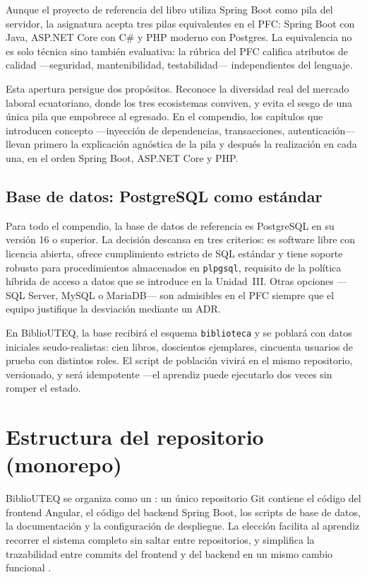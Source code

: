 Aunque el proyecto de referencia del libro utiliza Spring Boot como pila del servidor, la asignatura acepta tres pilas equivalentes en el PFC: Spring Boot con Java, ASP.NET Core con C\# y PHP moderno con Postgres. La equivalencia no es solo t\'ecnica sino tambi\'en evaluativa: la r\'ubrica del PFC califica atributos de calidad ---seguridad, mantenibilidad, testabilidad--- independientes del lenguaje.

Esta apertura persigue dos prop\'ositos. Reconoce la diversidad real del mercado laboral ecuatoriano, donde los tres ecosistemas conviven, y evita el sesgo de una \'unica pila que empobrece al egresado. En el compendio, los cap\'itulos que introducen concepto ---inyecci\'on de dependencias, transacciones, autenticaci\'on--- llevan primero la explicaci\'on agn\'ostica de la pila y despu\'es la realizaci\'on en cada una, en el orden Spring Boot, ASP.NET Core y PHP.

\subsection{Base de datos: PostgreSQL como est\'andar}
\label{sec:u0:arq:bd}

Para todo el compendio, la base de datos de referencia es PostgreSQL en su versi\'on 16 o superior. La decisi\'on descansa en tres criterios: es software libre con licencia abierta, ofrece cumplimiento estricto de SQL est\'andar y tiene soporte robusto para procedimientos almacenados en \texttt{plpgsql}, requisito de la pol\'itica h\'ibrida de acceso a datos que se introduce en la Unidad~III. Otras opciones ---SQL Server, MySQL o MariaDB--- son admisibles en el PFC siempre que el equipo justifique la desviaci\'on mediante un ADR.

En BiblioUTEQ, la base recibir\'a el esquema \texttt{biblioteca} y se poblar\'a con datos iniciales seudo-realistas: cien libros, doscientos ejemplares, cincuenta usuarios de prueba con distintos roles. El script de poblaci\'on vivir\'a en el mismo repositorio, versionado, y ser\'a idempotente ---el aprendiz puede ejecutarlo dos veces sin romper el estado.

\section{Estructura del repositorio (monorepo)}
\label{sec:u0:repo}

BiblioUTEQ se organiza como un : un \'unico repositorio Git contiene el c\'odigo del frontend Angular, el c\'odigo del backend Spring Boot, los scripts de base de datos, la documentaci\'on y la configuraci\'on de despliegue. La elecci\'on facilita al aprendiz recorrer el sistema completo sin saltar entre repositorios, y simplifica la trazabilidad entre commits del frontend y del backend en un mismo cambio funcional \cite{chacon2014progit}.

